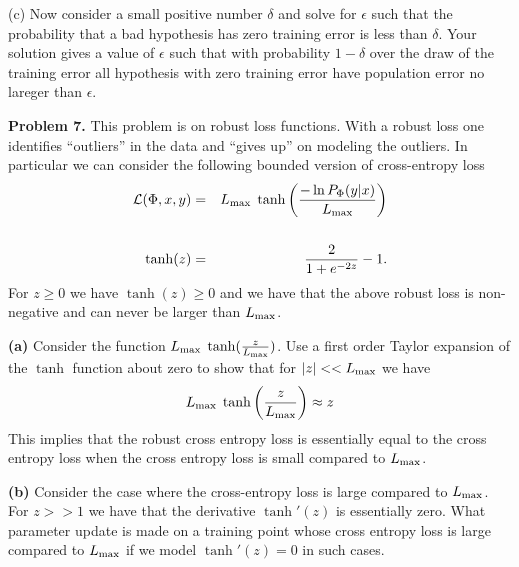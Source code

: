 \documentclass{article}
\newcommand{\solution}[1]{}
\begin{document}
\medskip
(c) Now consider a small positive number $\delta$ and solve for $\epsilon$ such that the probability that a bad hypothesis has zero training error is less than $\delta$.
Your solution gives a value of $\epsilon$  such that with probability $1-\delta$ over the draw of the training error all hypothesis with zero training error
have population error no lareger than $\epsilon$.

\solution{
  \begin{eqnarray*}
    \delta & = & |{\cal H}| e^{-N_{\mathrm{train}}\epsilon} \\
    \\
    \epsilon & = & \frac{\ln |{\cal H}| + \ln \frac{1}{\delta}}{N_{\mathrm{train}}}
  \end{eqnarray*}
  }
    
\bigskip
{\bf Problem 7.} This problem is on robust loss functions.  With a robust loss one identifies ``outliers'' in the data and ``gives up'' on modeling the outliers.
In particular we can consider the following bounded version of cross-entropy loss
\begin{eqnarray*}
  {\cal L}(\Phi,x,y) & = & L_{\max} \;\tanh \left(\frac{- \ln P_\Phi(y|x)}{L_{\max}}\right) \\
  \\
  \tanh(z) & = & \frac{2}{1+e^{-2z}} - 1.
\end{eqnarray*}
For $z \geq 0$ we have $\tanh(z) \geq 0$ and we have that the above robust loss is non-negative and can never be larger than $L_{\max}$.

\medskip
{\bf (a)}  Consider the function $L_{\max} \;\tanh(\frac{z}{L_{\max}})$. Use a first order Taylor expansion of the $\tanh$ function about zero to show that for $|z| << L_{\max}$ we have
$$L_{\max}\; \tanh\left(\frac{z}{L_{\max}}\right) \approx z$$
This implies that the robust cross entropy loss is essentially equal to the cross entropy loss when the cross entropy loss is small compared to $L_{\max}$.

\solution{
  The first order Taylor expansion of the $\tanh$ function about zero is
  $$\tanh(u) \approx u$$ yielding the desired result.
}

\medskip
{\bf (b)} Consider the case where the cross-entropy loss is large compared to $L_{\max}$.  For $z >> 1$ we have that the derivative $\tanh'(z)$ is essentially zero.
What parameter update is made on a training point whose cross entropy loss is large compared to $L_{\max}$ if we model $\tanh'(z) = 0$ in such cases.

\solution{
  The update on a data point $(x,y)$ is
  $$\Phi^{t+1} = \Phi^t - \eta \nabla_\Phi {\cal L}(\Phi,x,y)$$
  At a point where the derivative of the sigmoid is essentially zero this update will be essentially zero.  So ``outliers'' do not effect the model parameters.
}
\end{document}
